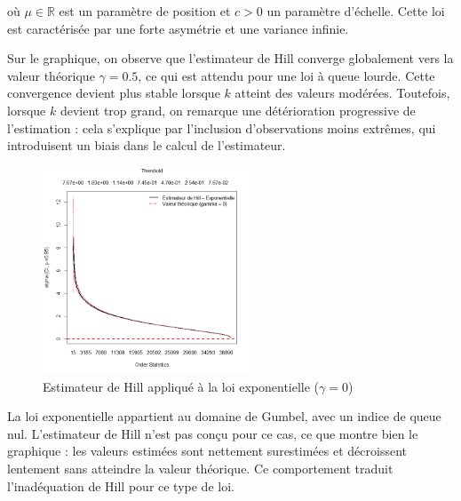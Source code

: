 \documentclass{article}
\theoremstyle{plain}
\theoremstyle{definition}
\theoremstyle{plain}
\begin{document}
où \(\mu \in \mathbb{R}\) est un paramètre de position et \(c > 0\) un paramètre d’échelle. Cette loi est caractérisée par une forte asymétrie et une variance infinie.

\noindent Sur le graphique, on observe que l’estimateur de Hill converge globalement vers la valeur théorique \(\gamma = 0.5\), ce qui est attendu pour une loi à queue lourde. Cette convergence devient plus stable lorsque \(k\) atteint des valeurs modérées. Toutefois, lorsque \(k\) devient trop grand, on remarque une détérioration progressive de l’estimation : cela s'explique par l’inclusion d’observations moins extrêmes, qui introduisent un biais dans le calcul de l’estimateur.
\begin{figure}[H]
    \centering
    \includegraphics[width=0.55\textwidth]{./Evolution des estimateurs/hill/estimateur_hill_exponentielle.png}
    \caption{Estimateur de Hill appliqué à la loi exponentielle ($\gamma = 0$)}
\end{figure}
\noindent La loi exponentielle appartient au domaine de Gumbel, avec un indice de queue nul. L’estimateur de Hill n’est pas conçu pour ce cas, ce que montre bien le graphique : les valeurs estimées sont nettement surestimées et décroissent lentement sans atteindre la valeur théorique. Ce comportement traduit l’inadéquation de Hill pour ce type de loi.
\end{document}
